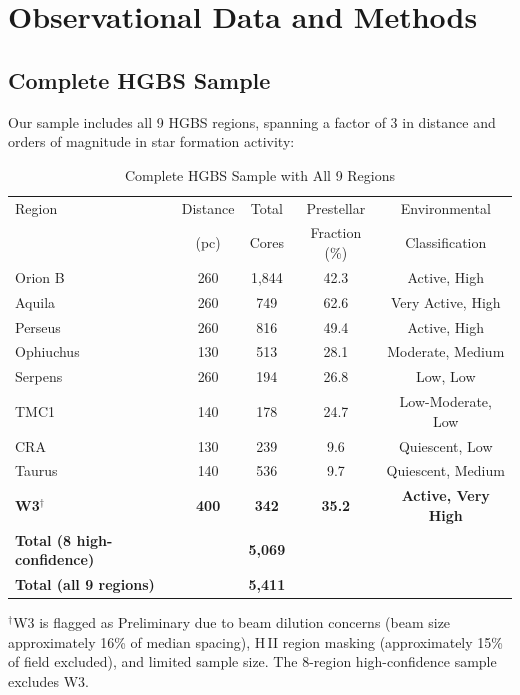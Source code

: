 \documentclass[11pt,a4paper]{article}
\begin{document}
\section{Observational Data and Methods}
\label{sec:observations}

\subsection{Complete HGBS Sample}

Our sample includes all 9 HGBS regions, spanning a factor of 3 in distance and orders of magnitude in star formation activity:

\begin{table}[H]
\centering
\caption{Complete HGBS Sample with All 9 Regions}
\label{tab:sample_overview}
\begin{tabular}{lcccc}
\toprule
Region & Distance & Total & Prestellar & Environmental \\
       & (pc)   & Cores & Fraction (\%) & Classification \\
\midrule
Orion B  & 260     & 1,844 & 42.3     & Active, High \\
Aquila   & 260     & 749   & 62.6     & Very Active, High \\
Perseus  & 260     & 816   & 49.4     & Active, High \\
Ophiuchus& 130     & 513   & 28.1     & Moderate, Medium \\
Serpens  & 260     & 194   & 26.8     & Low, Low \\
TMC1     & 140     & 178   & 24.7     & Low-Moderate, Low \\
CRA      & 130     & 239   & 9.6      & Quiescent, Low \\
Taurus   & 140     & 536   & 9.7      & Quiescent, Medium \\
\textbf{W3}$^{\dagger}$      & \textbf{400}     & \textbf{342}   & \textbf{35.2}     & \textbf{Active, Very High} \\
\midrule
\textbf{Total (8 high-confidence)} &        & \textbf{5,069} &        &  \\
\textbf{Total (all 9 regions)} &        & \textbf{5,411} &        &  \\
\bottomrule
\end{tabular}
\vspace{-0.5em}
\small{$^{\dagger}$W3 is flagged as Preliminary due to beam dilution concerns (beam size approximately 16\% of median spacing), H\,{\scriptsize II} region masking (approximately 15\% of field excluded), and limited sample size. The 8-region high-confidence sample excludes W3.}
\end{table}
\end{document}

